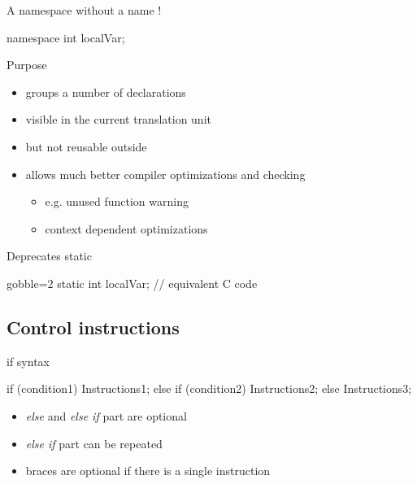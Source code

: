 \begin{frame}[fragile]
  \begin{exampleblock}{A namespace without a name !}
    \begin{cppcode*}{}
      namespace {
        int localVar;
      }
    \end{cppcode*}
  \end{exampleblock}
  \begin{block}{Purpose}
    \begin{itemize}
    \item groups a number of declarations
    \item visible in the current translation unit
    \item but not reusable outside
    \item allows much better compiler optimizations and checking
      \begin{itemize}
      \item e.g. unused function warning
      \item context dependent optimizations
      \end{itemize}
    \end{itemize}
  \end{block}
  \begin{alertblock}{Deprecates static}
    \begin{cppcode*}{gobble=2}
      static int localVar; // equivalent C code
    \end{cppcode*}
  \end{alertblock}
\end{frame}


\subsection[Control]{Control instructions}

\begin{frame}[fragile]
  \begin{block}{if syntax}
    \begin{cppcode*}{}
      if (condition1) {
        Instructions1;
      } else if (condition2) {
        Instructions2;
      } else {
        Instructions3;
      }
    \end{cppcode*}
    \begin{itemize}
      \item {\it else} and {\it else if} part are optional
      \item {\it else if} part can be repeated
      \item braces are optional if there is a single instruction
    \end{itemize}
  \end{block}
\end{frame}

